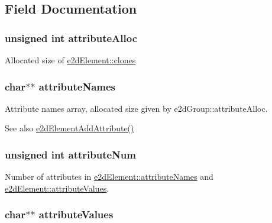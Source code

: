 \subsection{Field Documentation}
\hypertarget{structe2dElement_a70d94929e3789bf7c019c939b0084985}{
\subsubsection[{attribute\-Alloc}]{\setlength{\rightskip}{0pt plus 5cm}unsigned int {\bf attribute\-Alloc}}}\label{structe2dElement_a70d94929e3789bf7c019c939b0084985}
Allocated size of \hyperlink{structe2dElement_a4347bc7eb8d31d574115ef75ae074bb7}{e2d\-Element\-::clones} \hypertarget{structe2dElement_af9b5d9dbbf270b6f92a3ee66ce1b47ac}{
\subsubsection[{attribute\-Names}]{\setlength{\rightskip}{0pt plus 5cm}char$\ast$$\ast$ {\bf attribute\-Names}}}\label{structe2dElement_af9b5d9dbbf270b6f92a3ee66ce1b47ac}
Attribute names array, allocated size given by e2d\-Group\-::attribute\-Alloc. \begin{DoxySeeAlso}{See also}
\hyperlink{group__e2dElement_ga8a9021ff786f5fe61536d1c25ff0e377}{e2d\-Element\-Add\-Attribute()} 
\end{DoxySeeAlso}
\hypertarget{structe2dElement_a836181401227a3ca42da026a8d35e730}{
\subsubsection[{attribute\-Num}]{\setlength{\rightskip}{0pt plus 5cm}unsigned int {\bf attribute\-Num}}}\label{structe2dElement_a836181401227a3ca42da026a8d35e730}
Number of attributes in \hyperlink{structe2dElement_af9b5d9dbbf270b6f92a3ee66ce1b47ac}{e2d\-Element\-::attribute\-Names} and \hyperlink{structe2dElement_ae8591ff93c366b4d66817a70f2d9f33e}{e2d\-Element\-::attribute\-Values}. \hypertarget{structe2dElement_ae8591ff93c366b4d66817a70f2d9f33e}{
\subsubsection[{attribute\-Values}]{\setlength{\rightskip}{0pt plus 5cm}char$\ast$$\ast$ {\bf attribute\-Values}}}\label{structe2dElement_ae8591ff93c366b4d66817a70f2d9f33e}
